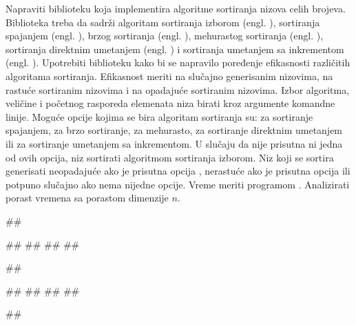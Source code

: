 \begin{Exercise}[label=3_12]
  Napraviti biblioteku koja implementira algoritme sortiranja nizova
  celih brojeva. Biblioteka treba da sadrži algoritam sortiranja
  izborom (engl. ), sortiranja spajanjem
  (engl. ), brzog sortiranja (engl. ), mehurastog sortiranja (engl. ),
  sortiranja direktnim umetanjem (engl. ) i
  sortiranja umetanjem sa inkrementom (engl. ). Upotrebiti biblioteku kako bi se napravilo poređenje
  efikasnosti različitih algoritama sortiranja. Efikasnost meriti na
  slučajno generisanim nizovima, na rastuće sortiranim nizovima i na
  opadajuće sortiranim nizovima. Izbor algoritma, veličine i početnog
  rasporeda elemenata niza birati kroz argumente komandne
  linije. Moguće opcije kojima se bira algoritam sortiranja su:
   za sortiranje spajanjem,  za brzo sortiranje,
   za mehurasto,  za sortiranje direktnim
  umetanjem ili  za sortiranje umetanjem sa inkrementom. U
  slučaju da nije prisutna ni jedna od ovih opcija, niz sortirati
  algoritmom sortiranja izborom. Niz koji se sortira generisati
  neopadajuće ako je prisutna opcija , nerastuće ako je
  prisutna opcija  ili potpuno slučajno ako nema nijedne
  opcije. Vreme meriti programom . Analizirati porast
  vremena sa porastom dimenzije $n$.

\begin{minitest}
\begin{test}{1}
##
  
#\naslovIzlaz#
##
##
##
\end{test}
\end{minitest}
\begin{minitest}
\begin{test}{2}
##
  
#\naslovIzlaz#
##
##
##
\end{test}
\end{minitest}
\begin{minitest}
\begin{test}{3}
##
  

\end{test}
\end{minitest}
\end{Exercise}
